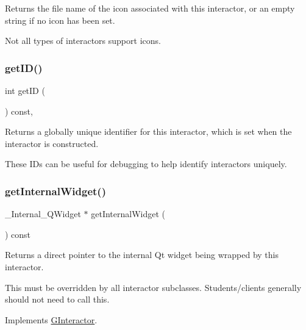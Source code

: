Returns the file name of the icon associated with this interactor, or an empty string if no icon has been set. 

Not all types of interactors support icons. \mbox{\label{classGInteractor_a9c9659a6c6ba66b4107ba59c95a24241}} 
\subsubsection{\texorpdfstring{get\+I\+D()}{getID()}}
{\footnotesize\ttfamily int get\+ID (\begin{DoxyParamCaption}{ }\end{DoxyParamCaption}) const\hspace{0.3cm}{\ttfamily [virtual]}, {\ttfamily [inherited]}}



Returns a globally unique identifier for this interactor, which is set when the interactor is constructed. 

These I\+Ds can be useful for debugging to help identify interactors uniquely. \mbox{\label{classGTextArea_a208ce13c1da40bf0ddb509daf99d6588}} 
\subsubsection{\texorpdfstring{get\+Internal\+Widget()}{getInternalWidget()}}
{\footnotesize\ttfamily \+\_\+\+Internal\+\_\+\+Q\+Widget $\ast$ get\+Internal\+Widget (\begin{DoxyParamCaption}{ }\end{DoxyParamCaption}) const\hspace{0.3cm}{\ttfamily [virtual]}}



Returns a direct pointer to the internal Qt widget being wrapped by this interactor. 

This must be overridden by all interactor subclasses. Students/clients generally should not need to call this. 

Implements \mbox{\hyperlink{classGInteractor}{G\+Interactor}}.

\mbox{\label{classGInteractor_a4f83802015511edeb63b892830812c11}} 

